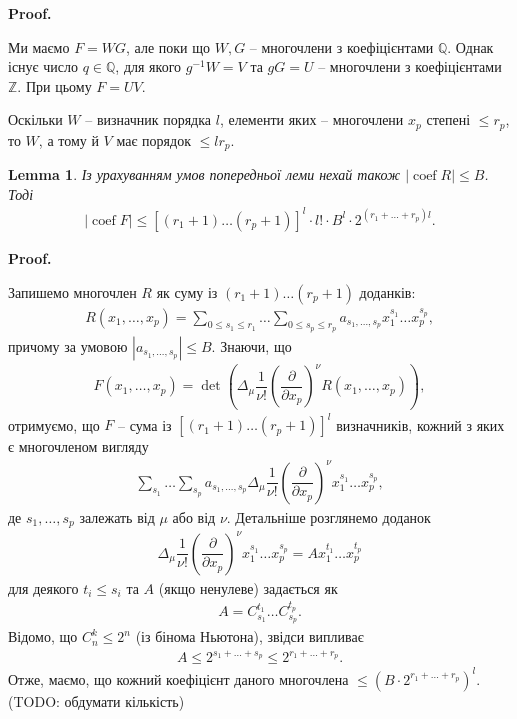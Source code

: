 \documentclass[a4paper, 10pt]{article}
\makeatletter
\theoremstyle{theoremdd}
\theoremstyle{theoremdd}
\theoremstyle{theoremdd}
\theoremstyle{theoremdd}
\theoremstyle{theoremdd}
\theoremstyle{theoremdd}
\theoremstyle{theoremdd}
\theoremstyle{theoremdd}
\theoremstyle{theoremdd}
\theoremstyle{theoremdd}
\theoremstyle{theoremdd}
\theoremstyle{theoremdd}
\theoremstyle{theoremdd}
\newtheorem{lemma}[theorem]{Lemma}
\theoremstyle{theoremdd}
\theoremstyle{theoremdd}
\renewenvironment{proof}[1][Proof.\\]{\par
\pushQED{\hfill \qed}%
\normalfont \topsep6\p@\@plus6\p@\relax
\trivlist
\item\relax
{\bfseries
#1\@addpunct{.}}\hspace\labelsep\ignorespaces
}{%
\popQED\endtrivlist\@endpefalse
}
\DeclareMathOperator{\coef}{coef}
\makeatother
\begin{document}
\begin{proof}
Ми маємо $F = WG$, але поки що $W,G$ -- многочлени з коефіцієнтами $\mathbb{Q}$. Однак існує число $q \in \mathbb{Q}$, для якого $g^{-1}W = V$ та $gG = U$ -- многочлени з коефіцієнтами $\mathbb{Z}$. При цьому $F = UV$.

Оскільки $W$ -- визначник порядка $l$, елементи яких -- многочлени $x_p$ степені $\leq r_p$, то $W$, а тому й $V$ має порядок $\leq lr_p$. 
\end{proof}

\begin{lemma}
Із урахуванням умов попередньої леми нехай також $|\coef R| \leq B$. Тоді
\begin{align*}
| \coef F| \leq [(r_1+1) \dots (r_p+1)]^l \cdot l! \cdot B^l \cdot 2^{(r_1+\dots+r_p)l}.
\end{align*}
\end{lemma}

\begin{proof}
Запишемо многочлен $R$ як суму із $(r_1+1) \dots (r_p+1)$ доданків:
\begin{align*}
R(x_1,\dots,x_p) = \displaystyle\sum_{0 \leq s_1 \leq r_1} \dots \sum_{0 \leq s_p \leq r_p} a_{s_1,\dots,s_p} x_1^{s_1} \dots x_p^{s_p},
\end{align*}
причому за умовою $|a_{s_1,\dots,s_p}| \leq B$. Знаючи, що
\begin{align*}
F(x_1,\dots,x_p) = \det \left( \Delta_\mu \dfrac{1}{\nu!} \left( \dfrac{\partial}{\partial x_p}\right)^\nu R (x_1,\dots,x_p) \right),
\end{align*}
отримуємо, що $F$ -- сума із $[(r_1+1)\dots (r_p+1)]^l$ визначників, кожний з яких є многочленом вигляду
\begin{align*}
\sum_{s_1} \dots \sum_{s_p} a_{s_1,\dots,s_p} \Delta_\mu \dfrac{1}{\nu !} \left( \dfrac{\partial}{\partial x_p} \right)^\nu x_1^{s_1} \dots x_p^{s_p},
\end{align*}
де $s_1,\dots,s_p$ залежать від $\mu$ або від $\nu$. Детальніше розглянемо доданок
\begin{align*}
\Delta_\mu \dfrac{1}{\nu !} \left( \dfrac{\partial}{\partial x_p} \right)^\nu x_1^{s_1} \dots x_p^{s_p} = A x_1^{t_1} \dots x_p^{t_p}
\end{align*}
для деякого $t_i \leq s_i$ та $A$ (якщо ненулеве) задається як
\begin{align*}
A = C_{s_1}^{t_1} \dots C_{s_p}^{t_p}.
\end{align*}
Відомо, що $C_n^k \leq 2^n$ (із бінома Ньютона), звідси випливає
\begin{align*}
A \leq 2^{s_1 + \dots + s_p} \leq 2^{r_1 + \dots + r_p}.
\end{align*}
Отже, маємо, що кожний коефіцієнт даного многочлена $\leq (B \cdot 2^{r_1+\dots+r_p})^l$.
(TODO: обдумати кількість)
\end{proof}
\end{document}
